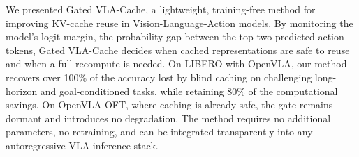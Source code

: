 \documentclass[letterpaper, 10 pt, conference]{ieeeconf}  %
\newcommand{\ourmethod}{Gated VLA-Cache}
\begin{document}
We presented \ourmethod{}, a lightweight, training-free method for
improving KV-cache reuse in Vision-Language-Action models.
By monitoring the model's logit margin, the probability gap between the
top-two predicted action tokens, \ourmethod{} decides when cached
representations are safe to reuse and when a full recompute is needed.
On LIBERO with OpenVLA, our method recovers over 100\% of the
accuracy lost by blind caching on challenging long-horizon and
goal-conditioned tasks, while retaining 80\% of the computational
savings. On OpenVLA-OFT, where caching is already safe, the gate remains
dormant and introduces no degradation.
The method requires no additional parameters, no retraining, and can
be integrated transparently into any autoregressive VLA inference stack.

\balance




\end{document}

